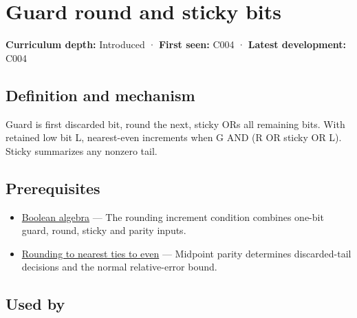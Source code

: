 \hypertarget{appendix-b572b631069b}{}\label{referencestart:appendix-b572b631069b}
\section{Guard round and sticky bits}\label{appendix-b572b631069b-guard-round-and-sticky-bits}

\hypertarget{appendix-b572b631069b-guard-round-and-sticky-bits}{}

\textbf{Curriculum depth:} Introduced · \textbf{First seen:} C004 · \textbf{Latest development:} C004

\begin{allmightroledefinition}

\subsection{Definition and mechanism}\label{appendix-b572b631069b-definition-and-mechanism}

\hypertarget{appendix-b572b631069b-definition-and-mechanism}{}

Guard is first discarded bit, round the next, sticky ORs all remaining bits. With retained low bit L, nearest-even increments when G AND (R OR sticky OR L). Sticky summarizes any nonzero tail.

\end{allmightroledefinition}

\subsection{Prerequisites}\label{appendix-b572b631069b-prerequisites}

\hypertarget{appendix-b572b631069b-prerequisites}{}

\begin{itemize}
\tightlist
\item
  \hyperref[appendix-24475e1596a8]{Boolean algebra} --- The rounding increment condition combines one-bit guard, round, sticky and parity inputs.
\item
  \hyperref[appendix-614afe1de592]{Rounding to nearest ties to even} --- Midpoint parity determines discarded-tail decisions and the normal relative-error bound.
\end{itemize}

\subsection{Used by}\label{appendix-b572b631069b-used-by}

